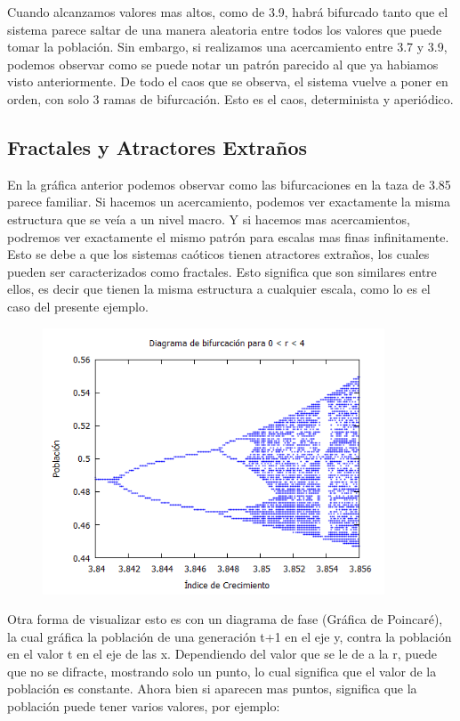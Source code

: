 \documentclass[12pt]{article}
\begin{document}
Cuando alcanzamos valores mas altos, como de 3.9, habrá bifurcado tanto que el sistema parece saltar de una manera aleatoria entre todos los valores que puede tomar la población. Sin embargo, si realizamos una acercamiento entre 3.7 y 3.9, podemos observar como se puede notar un patrón parecido al que ya habiamos visto anteriormente. De todo el caos que se observa, el sistema vuelve a poner en orden, con solo 3 ramas de bifurcación. Esto es el caos, determinista y aperiódico. 

\subsection{Fractales y Atractores Extraños}
En la gráfica anterior podemos observar como las bifurcaciones en la taza de 3.85 parece familiar. Si hacemos un acercamiento, podemos ver exactamente la misma estructura que se veía a un nivel macro. Y si hacemos mas acercamientos, podremos ver exactamente el mismo patrón para escalas mas finas infinitamente. Esto se debe a que los sistemas caóticos tienen atractores extraños, los cuales pueden ser caracterizados como fractales. Esto significa que son similares entre ellos, es decir que tienen la misma estructura a cualquier escala, como lo es el caso del presente ejemplo.

\begin{figure}[h!]
    \centering
\includegraphics[width=4in]{Bif4.png}
\end{figure}

Otra forma de visualizar esto es con un diagrama de fase (Gráfica de Poincaré), la cual gráfica la población de una generación t+1 en el eje y, contra la población en el valor t en el eje de las x. Dependiendo del valor que se le de a la r, puede que no se difracte, mostrando solo un punto, lo cual significa que el valor de la población es constante. Ahora bien si aparecen mas puntos, significa que la población puede tener varios valores, por ejemplo:
\end{document}
